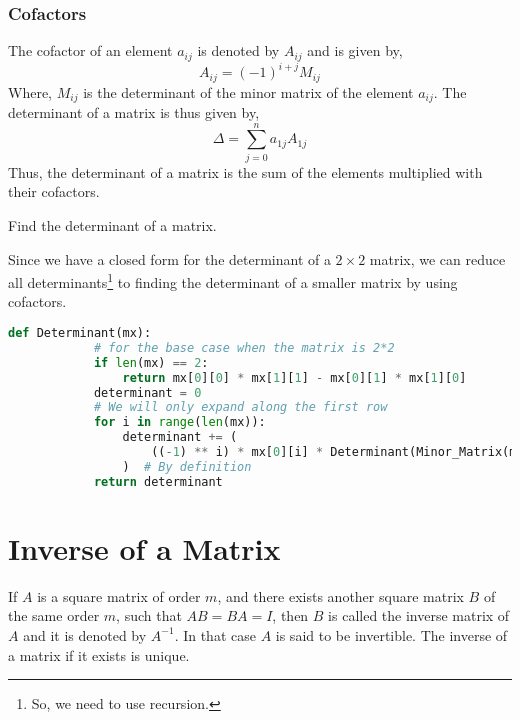 	\subsubsection{Cofactors}
	The cofactor of an element $a_{ij}$ is denoted by $A_{ij}$ and is given by,
	\[A_{ij}=(-1)^{i+j}M_{ij}\]
	Where, $M_{ij}$ is the determinant of the minor matrix of the element $a_{ij}$.
	The determinant of a matrix is thus given by,
	\[\Delta=\sum\limits_{j=0}^n a_{1j}A_{1j}\]
	Thus, the determinant of a matrix is the sum of the elements multiplied with their cofactors.
	\begin{eg}
		Find the determinant of a matrix.
	\end{eg}
	\begin{explanation}
		Since we have a closed form for the determinant of a $2\times 2$ matrix, we can reduce all determinants\footnote{So, we need to use recursion.} to finding the determinant of a smaller matrix by using cofactors.
		\begin{lstlisting}[language=Python]
			def Determinant(mx):
			# for the base case when the matrix is 2*2
			if len(mx) == 2:
				return mx[0][0] * mx[1][1] - mx[0][1] * mx[1][0]
			determinant = 0
			# We will only expand along the first row
			for i in range(len(mx)):
				determinant += (
					((-1) ** i) * mx[0][i] * Determinant(Minor_Matrix(mx, 0, i))
				)  # By definition
			return determinant \end{lstlisting}
	\end{explanation}
	\section{Inverse of a Matrix}
	If $A$ is a square matrix of order $m$, and there exists another square matrix $B$ of the same order $m$, such that $AB=BA=I$, then $B$ is called the inverse matrix of $A$ and it is denoted by $A^{-1}$. In that case $A$ is said to be invertible. The inverse of a matrix if it exists is unique.\
